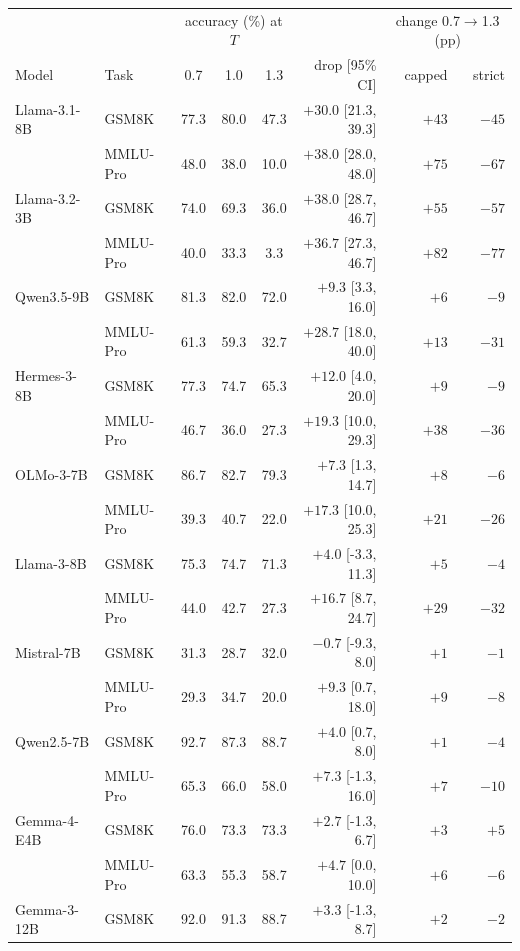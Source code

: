 \begin{tabular}{llcccrrr}
\toprule
 & & \multicolumn{3}{c}{accuracy (\%) at $T$} & & \multicolumn{2}{c}{change 0.7$\to$1.3 (pp)} \\
Model & Task & 0.7 & 1.0 & 1.3 & drop [95\% CI] & capped & strict \\
\midrule
Llama-3.1-8B & GSM8K & 77.3 & 80.0 & 47.3 & $\mathbf{+30.0}$ [21.3, 39.3] & $+43$ & $-45$ \\
 & MMLU-Pro & 48.0 & 38.0 & 10.0 & $\mathbf{+38.0}$ [28.0, 48.0] & $+75$ & $-67$ \\
Llama-3.2-3B & GSM8K & 74.0 & 69.3 & 36.0 & $\mathbf{+38.0}$ [28.7, 46.7] & $+55$ & $-57$ \\
 & MMLU-Pro & 40.0 & 33.3 & 3.3 & $\mathbf{+36.7}$ [27.3, 46.7] & $+82$ & $-77$ \\
Qwen3.5-9B & GSM8K & 81.3 & 82.0 & 72.0 & $+9.3$ [3.3, 16.0] & $+6$ & $-9$ \\
 & MMLU-Pro & 61.3 & 59.3 & 32.7 & $\mathbf{+28.7}$ [18.0, 40.0] & $+13$ & $-31$ \\
Hermes-3-8B & GSM8K & 77.3 & 74.7 & 65.3 & $+12.0$ [4.0, 20.0] & $+9$ & $-9$ \\
 & MMLU-Pro & 46.7 & 36.0 & 27.3 & $+19.3$ [10.0, 29.3] & $+38$ & $-36$ \\
OLMo-3-7B & GSM8K & 86.7 & 82.7 & 79.3 & $+7.3$ [1.3, 14.7] & $+8$ & $-6$ \\
 & MMLU-Pro & 39.3 & 40.7 & 22.0 & $+17.3$ [10.0, 25.3] & $+21$ & $-26$ \\
Llama-3-8B & GSM8K & 75.3 & 74.7 & 71.3 & $+4.0$ [-3.3, 11.3] & $+5$ & $-4$ \\
 & MMLU-Pro & 44.0 & 42.7 & 27.3 & $+16.7$ [8.7, 24.7] & $+29$ & $-32$ \\
\midrule
Mistral-7B & GSM8K & 31.3 & 28.7 & 32.0 & $-0.7$ [-9.3, 8.0] & $+1$ & $-1$ \\
 & MMLU-Pro & 29.3 & 34.7 & 20.0 & $+9.3$ [0.7, 18.0] & $+9$ & $-8$ \\
Qwen2.5-7B & GSM8K & 92.7 & 87.3 & 88.7 & $+4.0$ [0.7, 8.0] & $+1$ & $-4$ \\
 & MMLU-Pro & 65.3 & 66.0 & 58.0 & $+7.3$ [-1.3, 16.0] & $+7$ & $-10$ \\
Gemma-4-E4B & GSM8K & 76.0 & 73.3 & 73.3 & $+2.7$ [-1.3, 6.7] & $+3$ & $+5$ \\
 & MMLU-Pro & 63.3 & 55.3 & 58.7 & $+4.7$ [0.0, 10.0] & $+6$ & $-6$ \\
Gemma-3-12B & GSM8K & 92.0 & 91.3 & 88.7 & $+3.3$ [-1.3, 8.7] & $+2$ & $-2$ \\

\end{tabular}
